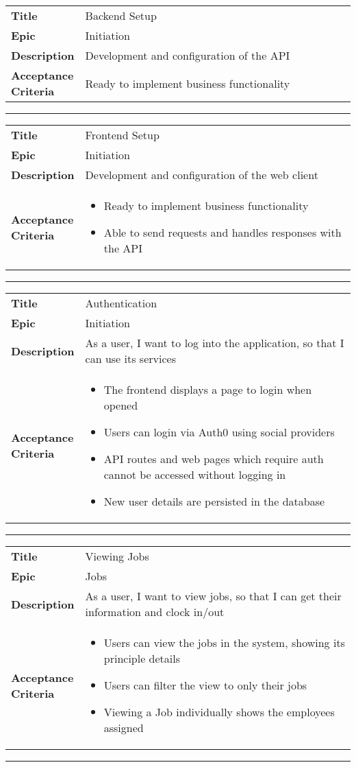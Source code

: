 \newcommand{\story}[4]
{
  \begin{tabular}{p{0.2\linewidth}p{0.8\linewidth}}

    \textbf{Title}               & #1 \\
    \textbf{Epic}                & #2 \\
    \textbf{Description}         & #3 \\
    \textbf{Acceptance Criteria} & #4 \\
  \end{tabular}
}

\story{Backend Setup}{Initiation}
{
  Development and configuration of the API
}
{
  Ready to implement business functionality
} \hrule

\story{Frontend Setup}{Initiation}
{
  Development and configuration of the web client
}
{
  \begin{itemize}[leftmargin=*]
    \item Ready to implement business functionality
    \item Able to send requests and handles responses with
          the API
  \end{itemize}
} \hrule

\story{Authentication}{Initiation}
{
  As a user, I want to log into the application, so that
  I can use its services
}
{
  \begin{itemize}[leftmargin=*]
  \item The frontend displays a page to login when opened
  \item Users can login via Auth0 using social providers
  \item API routes and web pages which require auth cannot
  be accessed without logging in
  \item New user details are persisted in the database
  \end{itemize}
} \hrule

\story{Viewing Jobs}{Jobs}
{
  As a user, I want to view jobs, so that I can get their
  information and clock in/out
}
{
  \begin{itemize}[leftmargin=*]
    \item Users can view the jobs in the system, showing
          its principle details
    \item Users can filter the view to only their jobs
    \item Viewing a Job individually shows the employees
          assigned
  \end{itemize}
}\hrule

